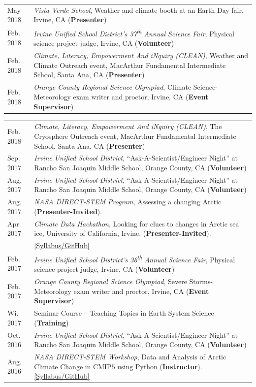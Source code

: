 \documentclass[margin,line,palatino,courier,10pt]{res}
\begin{document}
\begin{resume}
\begin{tabular}{@{}p{0.9in}p{4in}}
May 2018 & \textit{Vista Verde School}, Weather and climate booth at an Earth Day fair, Irvine, CA (\textbf{Presenter})\\
Feb. 2018 & \textit{Irvine Unified School District's 37\textsuperscript{th} Annual Science Fair}, Physical science project judge, Irvine, CA (\textbf{Volunteer})\\
Feb. 2018 & \textit{Climate, Literacy, Empowerment And iNquiry (CLEAN)}, Weather and Climate Outreach event, MacArthur Fundamental Intermediate School, Santa Ana, CA (\textbf{Presenter})\\
Feb. 2018 & \textit{Orange County Regional Science Olympiad}, Climate Science-Meteorology exam writer and proctor, Irvine, CA (\textbf{Event Supervisor})\\
\end{tabular}
\begin{tabular}{@{}p{0.9in}p{4in}}
Feb. 2018 & \textit{Climate, Literacy, Empowerment And iNquiry (CLEAN)}, The Cryosphere Outreach event, MacArthur Fundamental Intermediate School, Santa Ana, CA (\textbf{Presenter})\\
Sep. 2017 & \textit{Irvine Unified School District}, ``Ask-A-Scientist/Engineer Night'' at Rancho San Joaquin Middle School, Orange County, CA (\textbf{Volunteer})\\
Aug. 2017 & \textit{Irvine Unified School District}, ``Ask-A-Scientist/Engineer Night'' at Rancho San Joaquin Middle School, Orange County, CA (\textbf{Volunteer})\\
Aug. 2017 & \textit{NASA DIRECT-STEM Program}, Assessing a changing Arctic (\textbf{Presenter-Invited}).\\
Apr. 2017 & \textit{Climate Data Hackathon}, Looking for clues to changes in Arctic 
sea ice, University of California, Irvine. (\textbf{Presenter-Invited}).\\ & \href{https://github.com/UCIDataScienceInitiative/Climate_Hackathon}{[Syllabus/GitHub]}\\
Feb. 2017 & \textit{Irvine Unified School District's 36\textsuperscript{th} Annual Science Fair}, Physical science project judge, Irvine, CA (\textbf{Volunteer})\\
Feb. 2017 & \textit{Orange County Regional Science Olympiad}, Severe Storms-Meteorology exam writer and proctor, Irvine, CA (\textbf{Event Supervisor})\\
Wi. 2017 & Seminar Course -- Teaching Topics in Earth System Science (\textbf{Training})\\
Oct. 2016 & \textit{Irvine Unified School District}, ``Ask-A-Scientist/Engineer Night'' at Rancho San Joaquin Middle School, Orange County, CA (\textbf{Volunteer})\\
Aug. 2016 & \textit{NASA DIRECT-STEM Workshop}, Data and Analysis of Arctic Climate Change in CMIP$5$ using Python (\textbf{Instructor}). \href{https://github.com/strongh/DIRECT-STEM-climate-workshop}{[Syllabus/GitHub]}\\
\end{tabular}


\end{resume}
\end{document}
